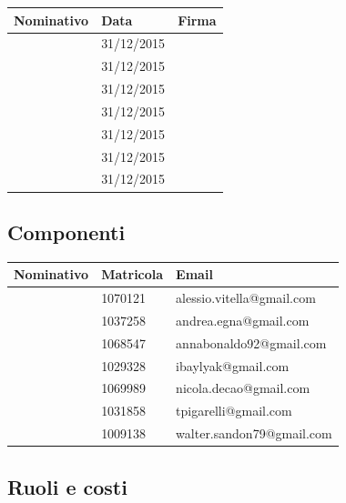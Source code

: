 \documentclass[12pt,a4paper]{article}
\begin{document}
\begin{table}[H]
	\begin{center}
		\begin{tabular}{l l l}
			\toprule
            \textbf{Nominativo}	& \textbf{Data} & \textbf{Firma} \\ \midrule
			\midrule
			\AVI & 31/12/2015 & \\ \midrule
			\AVE & 31/12/2015 & \\ \midrule
			\AB & 31/12/2015 & \\ \midrule
			\IB & 31/12/2015 & \\ \midrule
			\NDC & 31/12/2015 & \\ \midrule
			\TP & 31/12/2015 & \\ \midrule
			\WS & 31/12/2015 & \\
			\bottomrule
		\end{tabular}
	\end{center}
\end{table}

\subsection{Componenti}

\begin{table}[H]
	\begin{center}
		\begin{tabular}{l l l}
			\toprule
            \textbf{Nominativo}	& \textbf{Matricola} & \textbf{Email} \\ \midrule
			\midrule
			\AVI & 1070121 & alessio.vitella@gmail.com \\ \midrule
			\AVE & 1037258 & andrea.egna@gmail.com \\ \midrule
			\AB & 1068547 & annabonaldo92@gmail.com \\ \midrule
			\IB & 1029328 & ibaylyak@gmail.com \\ \midrule
			\NDC & 1069989 & nicola.decao@gmail.com \\ \midrule
			\TP  & 1031858 & tpigarelli@gmail.com \\ \midrule
			\WS & 1009138 & walter.sandon79@gmail.com \\
			\bottomrule
		\end{tabular}
	\end{center}
\end{table}

\subsection{Ruoli e costi}\label{ruoli e costi}
\end{document}

